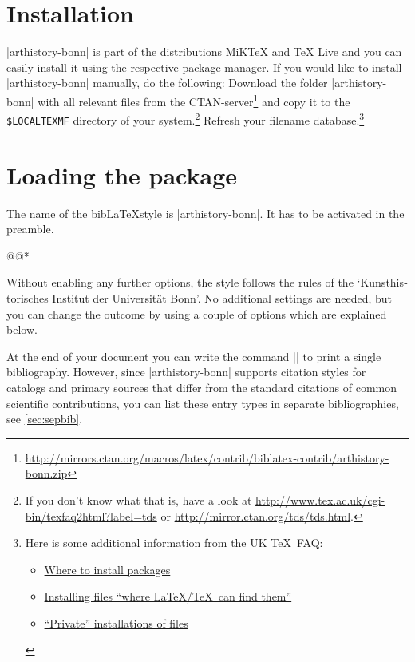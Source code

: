\documentclass[a4paper,
10pt,
ngerman,
english
]{ltxdoc}
\begin{document}
\section{Installation}
|arthistory-bonn| is part of the distributions MiK\TeX{} and \TeX{} Live and you can easily install it using the respective package manager. 
If you would like to install |arthistory-bonn| manually, do the following:
Download the folder |arthistory-bonn| with all relevant files from the CTAN-server\footnote{\url{http://mirrors.ctan.org/macros/latex/contrib/biblatex-contrib/arthistory-bonn.zip}} and copy it to the \texttt{\$LOCALTEXMF} directory of
 your system.\footnote{If you don't know what that is, have a look at
\url{http://www.tex.ac.uk/cgi-bin/texfaq2html?label=tds} or 
\url{http://mirror.ctan.org/tds/tds.html}.} 
Refresh your filename database.\footnote{ 
Here is some additional information from the UK \TeX\ FAQ:
\begin{itemize}[nosep,after=\vspace{-\baselineskip} ]
  \item \href{%
    http://www.tex.ac.uk/cgi-bin/texfaq2html?label=install-where}{%
    Where to install packages}
  \item \href{%
    http://www.tex.ac.uk/cgi-bin/texfaq2html?label=inst-wlcf}{%
    Installing files \enquote{where \LaTeX /\TeX\ can find them}}
  \item \href{%
    http://www.tex.ac.uk/cgi-bin/texfaq2html?label=privinst}{%
    \enquote{Private} installations of files}
\end{itemize}
}


\section{Loading the package}
  The name of the bib\LaTeX style is |arthistory-bonn|. It has to be activated in the preamble.

\begin{code}
\usepackage[style=arthistory-bonn,%
          *@@*]{biblatex}
@@*
\end{code}

Without enabling any further options, the style follows the rules of the \foreignquote*{ngerman}{Kunsthistorisches Institut der Universität Bonn}. No additional settings are needed, but you can change the outcome by using a couple of options which are explained below.

At the end of your document you can write the command |\printbibliography| to print 
a single bibliography.
However, since |arthistory-bonn| supports citation styles for catalogs and primary sources that differ from the standard citations of common scientific contributions, you can list these entry types in separate bibliographies, see \cref{sec:sepbib}.
\end{document}
